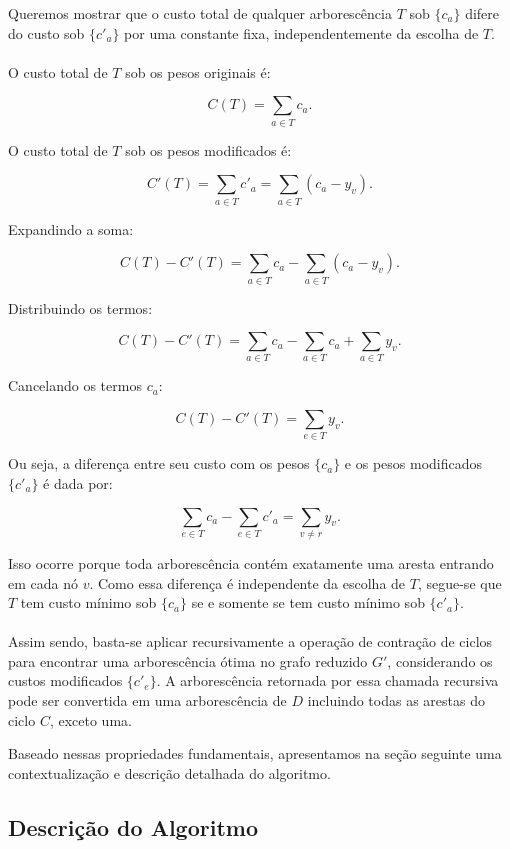 \documentclass[12pt,a4paper]{article}
\begin{document}
Queremos mostrar que o custo total de qualquer arborescência \( T \) sob \( \{c_a\} \) difere do custo sob \( \{c'_a\} \) por uma constante fixa, independentemente da escolha de \( T \).

\paragraph{}
O custo total de \( T \) sob os pesos originais é:

\[
C(T) = \sum_{a \in T} c_a.
\]

O custo total de \( T \) sob os pesos modificados é:

\[
C'(T) = \sum_{a \in T} c'_a = \sum_{a \in T} (c_a - y_v).
\]

Expandindo a soma:

\[
C(T) - C'(T) = \sum_{a \in T} c_a - \sum_{a \in T} (c_a - y_v).
\]

Distribuindo os termos:

\[
C(T) - C'(T) = \sum_{a \in T} c_a - \sum_{a \in T} c_a + \sum_{a \in T} y_v.
\]

Cancelando os termos \( c_a \):

\[
C(T) - C'(T) = \sum_{e \in T} y_v.
\]

Ou seja,  a diferença entre seu custo com os pesos \(\{c_a\}\) e os pesos modificados \(\{c'_a\}\) é dada por:

\[\sum_{e \in T} c_a - \sum_{e \in T} c'_a = \sum_{v \neq r} y_v.\]

Isso ocorre porque toda arborescência contém exatamente uma aresta entrando em cada nó \(v\). Como essa diferença é independente da escolha de \(T\), segue-se que \(T\) tem custo mínimo sob \(\{c_a\}\) se e somente se tem custo mínimo sob \(\{c'_a\}\).

\paragraph{}
Assim sendo, basta-se aplicar recursivamente a operação de contração de ciclos para encontrar uma arborescência ótima no grafo reduzido \( G' \), considerando os custos modificados \( \{ c'_e \} \). A arborescência retornada por essa chamada recursiva pode ser convertida em uma arborescência de \( D \) incluindo todas as arestas do ciclo \( C \), exceto uma.

Baseado nessas propriedades fundamentais, apresentamos na seção seguinte uma contextualização e descrição detalhada do algoritmo.

\subsection{Descrição do Algoritmo}
\end{document}
